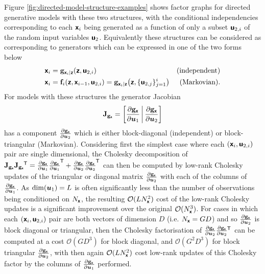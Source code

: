 Figure \ref{fig:directed-model-structure-examples} shows factor graphs for directed generative models with these two structures, with the conditional independencies corresponding to each $\boldsymbol{\mathsf{x}}_i$ being generated as a function of only a subset $\boldsymbol{\mathsf{u}}_{2,i}$ of the random input variables $\boldsymbol{\mathsf{u}}_2$. Equivalently these structures can be considered as corresponding to generators which can be expressed in one of the two forms below
\begin{align}\label{eq:elem_autoreg_model_struct}
    \rvct{x}_i &= \genfunc_{\rvct{x}_i|\rvct{z}}(\rvct{z}, \rvct{u}_{2,i})
    & \text{(independent)}\\
    \rvct{x}_{i} 
    &=
    \vctfunc{f}_i\lpa\rvct{z}, \rvct{x}_{i-1}, \rvct{u}_{2,i}\rpa = 
    \genfunc_{\rvct{x}_i|\rvct{z}}\lpa\rvct{z}, \lbrace\rvct{u}_{2,j}\rbrace^i_{j=1}\rpa & \text{(Markovian).}
\end{align}
For models with these structures the generator Jacobian
\begin{equation}
  \jacobian{\genfunc_{\rvct{x}}} =
  \lsb
   \pd{\genfunc_{\rvct{x}}}{\vct{u}_1} \,\middle|\,
   \pd{\genfunc_{\rvct{x}}}{\vct{u}_2}
  \rsb
\end{equation}
has a component $\frac{\partial {\mathbf{g}}_{\boldsymbol{\mathsf{x}}}}{\partial \boldsymbol{u}_2}$ which is either block-diagonal (independent) or block-triangular (Markovian). Considering first the simplest case where each $(\boldsymbol{\mathsf{x}}_i,\boldsymbol{\mathsf{u}}_{2,i})$ pair are single dimensional, the Cholesky decomposition of $\mathbf{J}_{{\mathbf{g}}_{\boldsymbol{\mathsf{x}}}}\mathbf{J}_{{\mathbf{g}}_{\boldsymbol{\mathsf{x}}}}\phantom{}^{\mkern-1.5mu\mathsf{T}} = \frac{\partial {\mathbf{g}}_{\boldsymbol{\mathsf{x}}}}{\partial \boldsymbol{u}_1}\frac{\partial {\mathbf{g}}_{\boldsymbol{\mathsf{x}}}}{\partial \boldsymbol{u}_1}^{\mkern-1.5mu\mathsf{T}} + \frac{\partial {\mathbf{g}}_{\boldsymbol{\mathsf{x}}}}{\partial \boldsymbol{u}_2} \frac{\partial {\mathbf{g}}_{\boldsymbol{\mathsf{x}}}}{\partial \boldsymbol{u}_2}^{\mkern-1.5mu\mathsf{T}}$ can then be computed by low-rank Cholesky updates of the triangular or diagonal matrix $\frac{\partial {\mathbf{g}}_{\boldsymbol{\mathsf{x}}}}{\partial \boldsymbol{u}_2}$ with each of the columns of $\frac{\partial {\mathbf{g}}_{\boldsymbol{\mathsf{x}}}}{\partial \boldsymbol{u}_1}$. As $\dim(\boldsymbol{u}_1) = L$ is often significantly less than the number of observations being conditioned on $N_{\boldsymbol{\mathsf{x}}}$, the resulting $\mathcal{O}(LN_{\boldsymbol{\mathsf{x}}}^2)$ cost of the low-rank Cholesky updates is a significant improvement over the original $\mathcal{O}(N_{\boldsymbol{\mathsf{x}}}^3)$. For cases in which each $(\boldsymbol{\mathsf{x}}_i,\boldsymbol{\mathsf{u}}_{2,i})$ pair are both vectors of dimension $D$ (i.e. $N_{\boldsymbol{\mathsf{x}}} = GD$) and so $\frac{\partial {\mathbf{g}}_{\boldsymbol{\mathsf{x}}}}{\partial \boldsymbol{u}_2}$ is block diagonal or triangular, then the Cholesky factorisation of  $\frac{\partial {\mathbf{g}}_{\boldsymbol{\mathsf{x}}}}{\partial \boldsymbol{u}_2} \frac{\partial {\mathbf{g}}_{\boldsymbol{\mathsf{x}}}}{\partial \boldsymbol{u}_2}\phantom{}^{\mkern-1.5mu\mathsf{T}}$ can be computed at a cost $\mathcal{O}(G D^3)$ for block diagonal, and $\mathcal{O}(G^2 D^3)$ for block triangular $\frac{\partial {\mathbf{g}}_{\boldsymbol{\mathsf{x}}}}{\partial \boldsymbol{u}_2}$, with then again $\mathcal{O}(LN_{\boldsymbol{\mathsf{x}}}^2)$ cost low-rank updates of this Cholesky factor by the columns of $\frac{\partial {\mathbf{g}}_{\boldsymbol{\mathsf{x}}}}{\partial \boldsymbol{u}_1}$ performed. 

